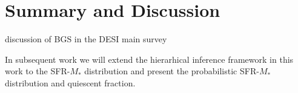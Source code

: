 \section{Summary and Discussion} \label{sec:summary}



discussion of BGS in the DESI main survey



In subsequent work we will extend the hierarhical inference framework in 
this work to the SFR-$M_*$ distribution and present the probabilistic 
SFR-$M_*$ distribution and quiescent fraction. 

